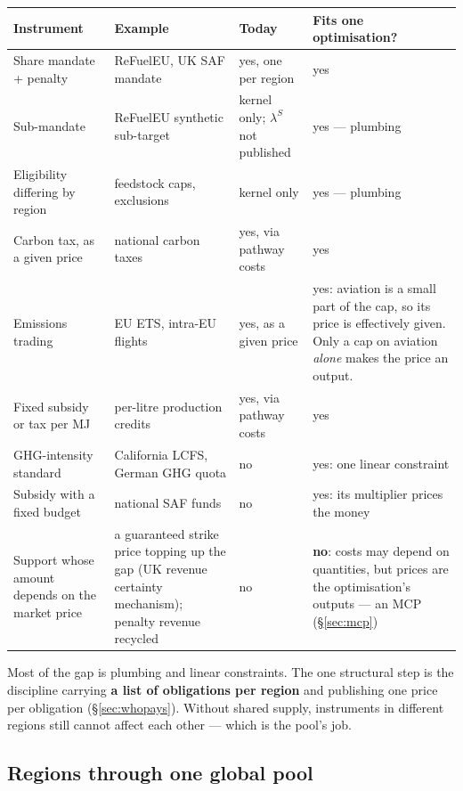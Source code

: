 \documentclass[11pt,a4paper]{article}
\begin{document}
\begin{table}[h]
\centering\small
\begin{tabular}{@{}p{3.6cm}p{3.6cm}p{3.0cm}p{5.0cm}@{}}
\toprule
\textbf{Instrument} & \textbf{Example} & \textbf{Today} & \textbf{Fits one optimisation?} \\
\midrule
Share mandate + penalty & ReFuelEU, UK SAF mandate & yes, one per region & yes \\
Sub-mandate & ReFuelEU synthetic sub-target & kernel only; $\lambda^{S}$ not published & yes --- plumbing \\
Eligibility differing by region & feedstock caps, exclusions & kernel only & yes --- plumbing \\
Carbon tax, as a given price & national carbon taxes & yes, via pathway costs & yes \\
Emissions trading & EU ETS, intra-EU flights & yes, as a given price & yes: aviation is a small part of the cap, so its price is effectively given. Only a cap on aviation \emph{alone} makes the price an output. \\
Fixed subsidy or tax per MJ & per-litre production credits & yes, via pathway costs & yes \\
GHG-intensity standard & California LCFS, German GHG quota & no & yes: one linear constraint \\
Subsidy with a fixed budget & national SAF funds & no & yes: its multiplier prices the money \\
Support whose amount depends on the market price & a guaranteed strike price topping up the gap (UK revenue certainty mechanism); penalty revenue recycled & no & \textbf{no}: costs may depend on quantities, but prices are the optimisation's outputs --- an MCP (\S\ref{sec:mcp}) \\
\bottomrule
\end{tabular}
\end{table}

\noindent Most of the gap is plumbing and linear constraints. The one structural step is the
discipline carrying \textbf{a list of obligations per region} and publishing one price per
obligation (\S\ref{sec:whopays}). Without shared supply, instruments in different regions still
cannot affect each other --- which is the pool's job.

\subsection{Regions through one global pool}
\end{document}
